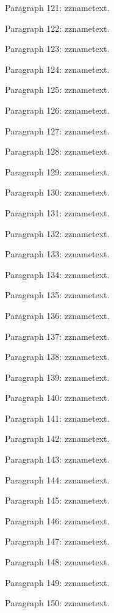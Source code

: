 \documentclass{article}
\begin{document}
Paragraph 121: \csname zzname\endcsname text.

Paragraph 122: \csname zzname\endcsname text.

Paragraph 123: \csname zzname\endcsname text.

Paragraph 124: \csname zzname\endcsname text.

Paragraph 125: \csname zzname\endcsname text.

Paragraph 126: \csname zzname\endcsname text.

Paragraph 127: \csname zzname\endcsname text.

Paragraph 128: \csname zzname\endcsname text.

Paragraph 129: \csname zzname\endcsname text.

Paragraph 130: \csname zzname\endcsname text.

Paragraph 131: \csname zzname\endcsname text.

Paragraph 132: \csname zzname\endcsname text.

Paragraph 133: \csname zzname\endcsname text.

Paragraph 134: \csname zzname\endcsname text.

Paragraph 135: \csname zzname\endcsname text.

Paragraph 136: \csname zzname\endcsname text.

Paragraph 137: \csname zzname\endcsname text.

Paragraph 138: \csname zzname\endcsname text.

Paragraph 139: \csname zzname\endcsname text.

Paragraph 140: \csname zzname\endcsname text.

Paragraph 141: \csname zzname\endcsname text.

Paragraph 142: \csname zzname\endcsname text.

Paragraph 143: \csname zzname\endcsname text.

Paragraph 144: \csname zzname\endcsname text.

Paragraph 145: \csname zzname\endcsname text.

Paragraph 146: \csname zzname\endcsname text.

Paragraph 147: \csname zzname\endcsname text.

Paragraph 148: \csname zzname\endcsname text.

Paragraph 149: \csname zzname\endcsname text.

Paragraph 150: \csname zzname\endcsname text.
\end{document}
